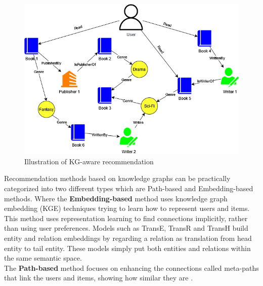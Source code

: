 \documentclass[\myFontSize,oneside,english,hidelinks,a4paper]{article}
\begin{document}
\begin{figure}[h!]
    \centering
    \includegraphics[width=1\textwidth]{img/knowledge_graph_example.png}
    \caption{Illustration of KG-aware recommendation}
    \label{fig:knowledge_graph_example}
\end{figure}
%
%
\newpage{}
Recommendation methods based on knowledge graphs can be practically categorized into two different types which are Path-based and Embedding-based methods. Where the \textbf{Embedding-based} method uses knowledge graph embedding (KGE) techniques trying to learn how to represent users and items. This method uses representation learning to find connections implicitly, rather than using user preferences. Models such as TransE, TransR and TransH build entity and relation embeddings by regarding a relation as translation from head entity to tail entity. These models simply put both entities and relations within the same semantic space. \cite{pub.1148917041}\\
The \textbf{Path-based} method focuses on enhancing the connections called meta-paths that link the users and items, showing how similar they are \cite{Yang20229308}. \\
%
\end{document}
